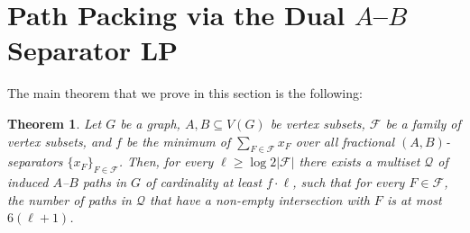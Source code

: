 \documentclass[11pt]{amsart}
\newtheorem{theorem}{Theorem}[section]
\newcommand{\cal}{\mathcal}
\begin{document}

\section{Path Packing via the Dual $A$--$B$ Separator LP}\label{sec:ab_sampling}
The main theorem that we prove in this section is the following:

\begin{theorem}
\label{thm:A-B_path_packing}
Let $G$ be a graph, $A, B \subseteq V(G)$ be vertex subsets, $\mathcal{F}$ be a family of vertex subsets, and $f$ be the minimum of $\sum_{F \in {\cal F}} x_F$ over all fractional $(A, B)$-separators $\{x_F\}_{F\in{\cal F}}$. Then, for every $\ell \geq \log 2|{\cal F}|$ there exists a multiset $\mathcal{Q}$ of induced $A$--$B$ paths in $G$ of cardinality at least $f \cdot \ell$, such that for every $F \in \mathcal{F}$, the number of paths in $\mathcal{Q}$ that have a non-empty intersection with $F$ is at most $6(\ell+1)$.
\end{theorem}
\end{document}

